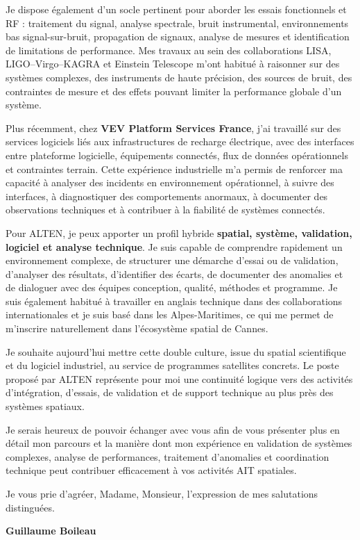 \documentclass[11pt,a4paper]{altacv}
\begin{document}
{Je dispose également d'un socle pertinent pour aborder les essais fonctionnels et RF : traitement du signal, analyse spectrale, bruit instrumental, environnements bas signal-sur-bruit, propagation de signaux, analyse de mesures et identification de limitations de performance. Mes travaux au sein des collaborations LISA, LIGO--Virgo--KAGRA et Einstein Telescope m'ont habitué à raisonner sur des systèmes complexes, des instruments de haute précision, des sources de bruit, des contraintes de mesure et des effets pouvant limiter la performance globale d'un système.

Plus récemment, chez \textbf{VEV Platform Services France}, j'ai travaillé sur des services logiciels liés aux infrastructures de recharge électrique, avec des interfaces entre plateforme logicielle, équipements connectés, flux de données opérationnels et contraintes terrain. Cette expérience industrielle m'a permis de renforcer ma capacité à analyser des incidents en environnement opérationnel, à suivre des interfaces, à diagnostiquer des comportements anormaux, à documenter des observations techniques et à contribuer à la fiabilité de systèmes connectés.

Pour ALTEN, je peux apporter un profil hybride \textbf{spatial, système, validation, logiciel et analyse technique}. Je suis capable de comprendre rapidement un environnement complexe, de structurer une démarche d'essai ou de validation, d'analyser des résultats, d'identifier des écarts, de documenter des anomalies et de dialoguer avec des équipes conception, qualité, méthodes et programme. Je suis également habitué à travailler en anglais technique dans des collaborations internationales et je suis basé dans les Alpes-Maritimes, ce qui me permet de m'inscrire naturellement dans l'écosystème spatial de Cannes.

Je souhaite aujourd'hui mettre cette double culture, issue du spatial scientifique et du logiciel industriel, au service de programmes satellites concrets. Le poste proposé par ALTEN représente pour moi une continuité logique vers des activités d'intégration, d'essais, de validation et de support technique au plus près des systèmes spatiaux.

Je serais heureux de pouvoir échanger avec vous afin de vous présenter plus en détail mon parcours et la manière dont mon expérience en validation de systèmes complexes, analyse de performances, traitement d'anomalies et coordination technique peut contribuer efficacement à vos activités AIT spatiales.

Je vous prie d'agréer, Madame, Monsieur, l'expression de mes salutations distinguées.

\textbf{Guillaume Boileau}

}
\end{document}
